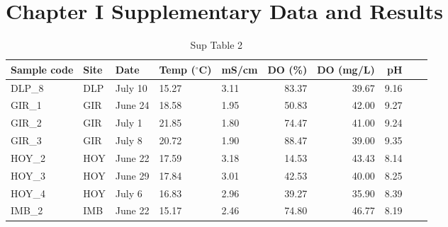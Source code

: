 \section{Chapter I Supplementary Data and Results}

%

\small
\begin{longtable}{lllllrrrrr}
\caption{Sup Table 2}
\label{tab:water_qual}\\
  \hline
  Sample code & Site & Date & Temp ($^{\circ}$C) & mS/cm & DO (\%) & DO (mg/L) & pH \\
  \hline
  DLP\_8 & DLP & July 10 & 15.27 & 3.11 & 83.37 & 39.67 & 9.16 \\
  GIR\_1 & GIR & June 24 & 18.58 & 1.95 & 50.83 & 42.00 & 9.27 \\
  GIR\_2 & GIR & July 1 & 21.85 & 1.80 & 74.47 & 41.00 & 9.24 \\
  GIR\_3 & GIR & July 8 & 20.72 & 1.90 & 88.47 & 39.00 & 9.35 \\
  HOY\_2 & HOY & June 22 & 17.59 & 3.18 & 14.53 & 43.43 & 8.14 \\
  HOY\_3 & HOY & June 29 & 17.84 & 3.01 & 42.53 & 40.00 & 8.25 \\
  HOY\_4 & HOY & July 6 & 16.83 & 2.96 & 39.27 & 35.90 & 8.39 \\
  IMB\_2 & IMB & June 22 & 15.17 & 2.46 & 74.80 & 46.77 & 8.19 \\
   \hline
\end{longtable}

%
